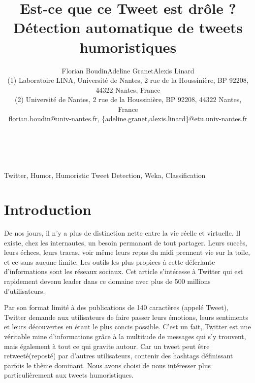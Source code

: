 \documentclass[10pt,a4paper,twoside]{article}
\title{Est-ce que ce Tweet est drôle ? Détection automatique de tweets humoristiques}
\author{Florian Boudin\up{1}\quad Adeline Granet\up{2}\quad Alexis Linard\up{2}\\
  (1) Laboratoire LINA, Université de Nantes, 2 rue de la Houssinière, BP 92208, 44322 Nantes, France \\ 
  (2) Université de Nantes, 2 rue de la Houssinière, BP 92208, 44322 Nantes, France\\ 
  florian.boudin@univ-nantes.fr, \{adeline.granet,alexis.linard\}@etu.univ-nantes.fr \\ 
}
\begin{document}
\maketitle


\\

\\

{Twitter, Humor, Humoristic Tweet Detection, Weka, Classification}



\section{Introduction}


De nos jours, il n’y a plus de distinction nette entre la vie réelle et virtuelle. Il existe, chez les internautes, un besoin permanant de tout partager. Leurs succès, leurs échecs, leurs tracas, voir même leurs repas du midi prennent vie sur la toile, et ce sans aucune limite. Les outils les plus propices à cette déferlante d’informations sont les réseaux sociaux. Cet article s'intéresse à Twitter qui est rapidement devenu leader dans ce domaine avec plus de 500 millions d’utilisateurs.

Par son format limité à des publications de 140 caractères (appelé Tweet), Twitter demande aux utilisateurs de faire passer leurs émotions, leurs sentiments et leurs découvertes en étant le plus concis possible. C’est un fait, Twitter est une véritable mine d’informations grâce à la multitude de messages qui s'y trouvent, mais également à tout ce qui gravite autour. Car un tweet peut être retweeté(reposté) par d'autres utilisateurs, contenir des hashtags définissant parfois le thème dominant.  Nous avons choisi de nous intéresser plus particulièrement aux tweets humoristiques.
\end{document}
